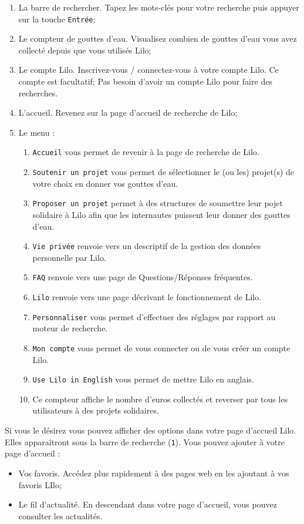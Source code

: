 \documentclass[12pt]{book}
\begin{document}
		\begin{enumerate}
			\item La barre de rechercher.
					Tapez les mots-clés pour votre recherche puis appuyer sur la touche \texttt{Entrée};
			\item Le compteur de gouttes d'eau.
					Visualisez combien de gouttes d'eau vous avez collecté depuis que vous utilisés Lilo;
			\item Le compte Lilo.
					Inscrivez-vous / connectez-vous à votre compte Lilo.
					Ce compte est facultatif;
					Pas besoin d'avoir un compte Lilo pour faire des recherches.
			\item L'accueil.
					Revenez sur la page d'accueil de recherche de Lilo;
			\item Le menu :\newline
			\begin{enumerate}
				\item \texttt{Accueil} vous permet de revenir à la page de recherche de Lilo.
				\item \texttt{Soutenir un projet} vous permet de sélectionner le (ou les) projet(s) de votre choix en donner vos gouttes d'eau.
				\item \texttt{Proposer un projet} permet à des structures de soumettre leur pojet solidaire à Lilo afin que les internautes puissent leur donner des gouttes d'eau.
				\item \texttt{Vie privée} renvoie vers un descriptif de la gestion des données personnelle par Lilo.
				\item \texttt{FAQ} renvoie vers une page de Questions/Réponses fréquentes.
				\item \texttt{Lilo} renvoie vers une page décrivant le fonctionnement de Lilo.
				\item \texttt{Personnaliser} vous permet d'effectuer des réglages par rapport au moteur de recherche.
				\item \texttt{Mon compte} vous permet de vous connecter ou de vous créer un compte Lilo.
				\item \texttt{Use Lilo in English} vous permet de mettre Lilo en anglais.
				\item Ce compteur affiche le nombre d'euros collectés et reverser par tous les utilisateurs à des projets solidaires.
			\end{enumerate}
		\end{enumerate}
		Si vous le désirez vous pouvez afficher des options dans votre page d'accueil Lilo.
		Elles apparaîtront sous la barre de recherche (\texttt{1}).
		Vous pouvez ajouter à votre page d'accueil :
		\begin{itemize}
			\item Vos favoris.
					Accédez plus rapidement à des pages web en les ajoutant à vos favoris LIlo;
			\item Le fil d'actualité.
					En descendant dans votre page d'accueil, vous pouvez consulter les actualités.
		\end{itemize}	
\end{document}
